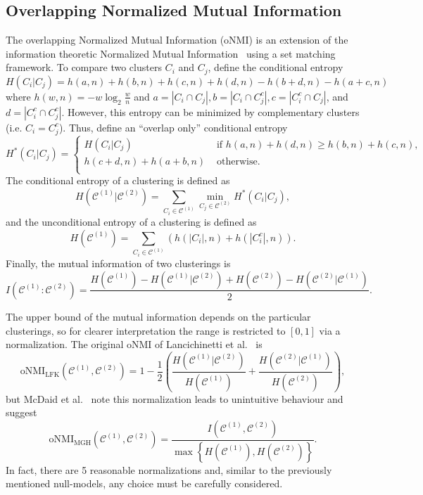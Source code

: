 \documentclass[review,los,12pt]{ryethesis}
\newcommand\cCone{\mathcal{C}^{(1)}}
\newcommand\cCtwo{\mathcal{C}^{(2)}}
\begin{document}
\subsection{Overlapping Normalized Mutual Information}
The overlapping Normalized Mutual Information (oNMI) \cite{onmi} is an extension of the information theoretic Normalized Mutual Information~\cite{ami} using a set matching framework.
To compare two clusters $C_i$ and $C_j$, define the conditional entropy
\begin{equation}
    H(C_i | C_j) = h(a,n) + h(b,n) + h(c,n) + h(d,n) - h(b+d,n) - h(a+c,n)
\end{equation}
where $h(w,n) = -w \log_2 \frac{w}{n}$ and $a = |C_i \cap C_j|, b = |C_i \cap C_j^c|, c = |C_i^c \cap C_j|$, and $d=|C_i^c \cap C_j^c|$.
However, this entropy can be minimized by complementary clusters (i.e. $C_i = C_j^c$).
Thus, define an ``overlap only'' conditional entropy
\begin{equation}
    H^*(C_i | C_j) = \begin{cases}
        H(C_i | C_j) & \text{ if } h(a,n) + h(d,n) \geq h(b,n) + h(c,n),\\
        h(c+d,n) + h(a+b,n) & \text{ otherwise.}\\
    \end{cases}
\end{equation}
The conditional entropy of a clustering is defined as
\begin{equation}
    H(\cCone | \cCtwo) = \sum_{C_i \in \cCone} \min_{C_j \in \cCtwo} H^*(C_i | C_j),
\end{equation}
and the unconditional entropy of a clustering is defined as
\begin{equation*}
    H(\cCone) = \sum_{C_i \in \cCone} \left(h(|C_i|, n) + h(|C_i^c|, n)\right).
\end{equation*}
Finally, the mutual information of two clusterings is
\begin{equation*}
    I(\cCone:\cCtwo) = \frac{H(\cCone) - H(\cCone | \cCtwo) + H(\cCtwo) - H(\cCtwo | \cCone)}{2}.
\end{equation*}

The upper bound of the mutual information depends on the particular clusterings, so for clearer interpretation the range  is restricted to $[0,1]$ via a normalization.
The original oNMI of Lancichinetti et al.~\cite{onmi} is
\begin{equation}
    \mathrm{oNMI_{LFK}}(\cCone, \cCtwo) = 1 - \frac{1}{2}\left(\frac{H(\cCone|\cCtwo)}{H(\cCone)} + \frac{H(\cCtwo|\cCone)}{H(\cCtwo)}\right),
\end{equation}
but McDaid et al.~\cite{onmi2} note this normalization leads to unintuitive behaviour and suggest
\begin{equation}
    \mathrm{oNMI_{MGH}}(\cCone, \cCtwo) = \frac{I(\cCone, \cCtwo)}{\max \left\{H(\cCone), H(\cCtwo)\right\}}.
\end{equation}
In fact, there are 5 reasonable normalizations \cite{ami} and, similar to the previously mentioned null-models, any choice must be carefully considered.
\end{document}
